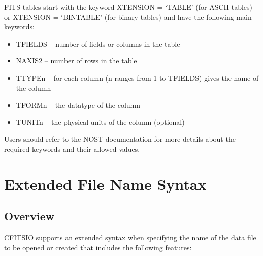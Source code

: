 \documentclass[11pt]{book}
\begin{document}
FITS tables start with the keyword XTENSION = `TABLE' (for ASCII
tables) or XTENSION = `BINTABLE' (for binary tables) and have the
following main keywords:
\begin{itemize}
\item
TFIELDS -- number of fields or columns in the table
\item
NAXIS2 -- number of rows in the table
\item
TTYPEn -- for each column (n ranges from 1 to TFIELDS) gives the
name of the column
\item
TFORMn -- the datatype of the column
\item
TUNITn -- the physical units of the column (optional)
\end{itemize}

Users should refer to the NOST documentation for more details about the
required keywords and their allowed values.


\chapter{  Extended File Name Syntax }


\section{Overview}

CFITSIO supports an extended syntax when specifying the name of the
data file to be opened or created  that includes the following
features:
\end{document}
